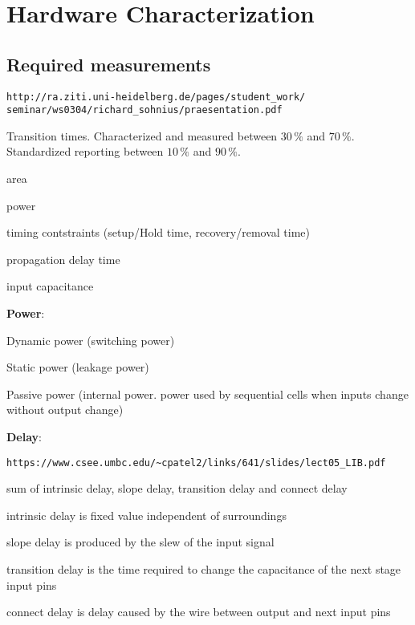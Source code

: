 \section*{Hardware Characterization}

\subsection*{Required measurements}
\begin{lstlisting}
http://ra.ziti.uni-heidelberg.de/pages/student_work/
seminar/ws0304/richard_sohnius/praesentation.pdf
\end{lstlisting}


Transition times. Characterized and measured between $30\,\%$ and $70\,\%$. Standardized reporting between $10\,\%$ and $90\,\%$.


\begin{s_itemize} 
\item area
\item power
\item timing contstraints (setup/Hold time, recovery/removal time)
\item propagation delay time
\item input capacitance
\end{s_itemize} 
%
%
\textbf{Power}:
\begin{s_itemize}
	\item Dynamic power (switching power)
	\item Static power (leakage power)
	\item Passive power (internal power. power used by sequential cells when inputs change without output change)
\end{s_itemize}
%
%
\textbf{Delay}:
\begin{lstlisting}
https://www.csee.umbc.edu/~cpatel2/links/641/slides/lect05_LIB.pdf
\end{lstlisting}

\begin{s_itemize}
\item sum of intrinsic delay, slope delay, transition delay and connect delay
\item intrinsic delay is fixed value independent of surroundings
\item slope delay is produced by the slew of the input signal
\item transition delay is the time required to change the capacitance of the next stage input pins
\item connect delay is delay caused by the wire between output and next input pins
\end{s_itemize}

